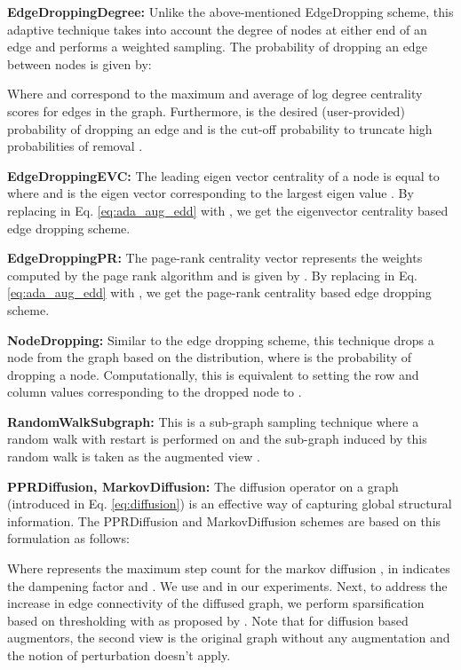 \documentclass{article}
\theoremstyle{plain}
\theoremstyle{definition}
\theoremstyle{remark}
\begin{document}
\textbf{EdgeDroppingDegree:} Unlike the above-mentioned EdgeDropping scheme, this adaptive technique takes into account the degree of nodes at either end of an edge and performs a weighted sampling. The probability of dropping an edge between nodes  is given by:



Where  and  correspond to the maximum and average of log degree centrality scores for edges in the graph. Furthermore,  is the desired (user-provided) probability of dropping an edge and  is the cut-off probability to truncate high probabilities of removal \citep{zhu2021graph}.

\textbf{EdgeDroppingEVC:} The leading eigen vector centrality of a node  is equal to  where  and  is the eigen vector corresponding to the largest eigen value . By replacing  in Eq. \ref{eq:ada_aug_edd} with , we get the eigenvector centrality based edge dropping scheme.

\textbf{EdgeDroppingPR:} The page-rank centrality vector represents the weights computed by the page rank algorithm \citep{page1999pagerank} and is given by  \citep{zhu2021graph}. By replacing  in Eq. \ref{eq:ada_aug_edd} with , we get the page-rank centrality based edge dropping scheme.

\textbf{NodeDropping:} Similar to the edge dropping scheme, this technique drops a node  from the graph based on the  distribution, where  is the probability of dropping a node. Computationally, this is equivalent to setting the row and column values corresponding to the dropped node to .

\textbf{RandomWalkSubgraph:} This is a sub-graph sampling technique where a random walk with restart is performed on  and the sub-graph induced by this random walk is taken as the augmented view \citep{zhu2021empirical}.

\textbf{PPRDiffusion, MarkovDiffusion:} The diffusion operator on a graph (introduced in Eq. \ref{eq:diffusion}) is an effective way of capturing global structural information. The PPRDiffusion and MarkovDiffusion schemes are based on this formulation as follows:

Where  represents the maximum step count for the markov diffusion \citep{zhu2020simple},  in  indicates the dampening factor and . We use  and  in our experiments. Next, to address the increase in edge connectivity of the diffused graph, we perform sparsification based on thresholding with  as proposed by \citet{klicpera2019diffusion}. Note that for diffusion based augmentors, the second view is the original graph without any augmentation and the notion of perturbation  doesn't apply.
\end{document}
